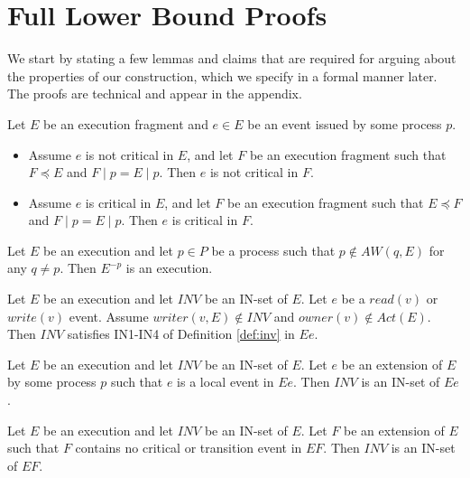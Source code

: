 \section{Full Lower Bound Proofs}
\label{sec:FullProof}

We start by stating a few lemmas and claims that are required for arguing about the properties of our construction, which we specify in a formal manner later. The proofs are technical and appear in the appendix.

\begin{claim-num}  \label{claim: maintain-criticalness}
	Let $E$ be an execution fragment and $e \in E$ be an event issued by some process $p$.
	\begin{itemize}
		\item Assume $e$ is not critical in $E$, and let $F$ be an execution fragment such that $F \preceq E$ and $F \mid p = E \mid p$. Then $e$ is not critical in $F$.
		\item Assume $e$ is critical in $E$, and let $F$ be an execution fragment such that $E \preceq F$ and $F \mid p = E \mid p$. Then $e$ is critical in $F$.
	\end{itemize}
\end{claim-num}

\begin{lemma} \label{lem: sub-execution}
	Let $E$ be an execution and let $p \in P$ be a process such that $p \notin AW(q,E)$ for any $q \neq p$. Then $E^{-p}$ is an execution.
\end{lemma}

\begin{lemma}  \label{lem: access-visible-variable}
	Let $E$ be an execution and let $\mathit{INV}$ be an IN-set of $E$. Let $e$ be a $read(v)$ or $write(v)$ event. Assume $writer(v,E) \notin \mathit{INV}$ and $owner(v) \notin Act(E)$. Then $\mathit{INV}$ satisfies IN1-IN4 of Definition \ref{def:inv} in $E e$.
\end{lemma}

\begin{claim} \label{claim: local-event-extension}
	Let $E$ be an execution and let $\mathit{INV}$ be an IN-set of $E$. Let $e$ be an extension of $E$ by some process $p$ such that $e$ is a local event in $E e$. Then $\mathit{INV}$ is an IN-set of $E e$.
\end{claim}

\begin{lemma} \label{lem: non-critical-extension}
	Let $E$ be an execution and let $\mathit{INV}$ be an IN-set of $E$. Let $F$ be an extension of $E$ such that $F$ contains no critical or transition event in $E F$. Then $\mathit{INV}$ is an IN-set of $E F$.
\end{lemma}

